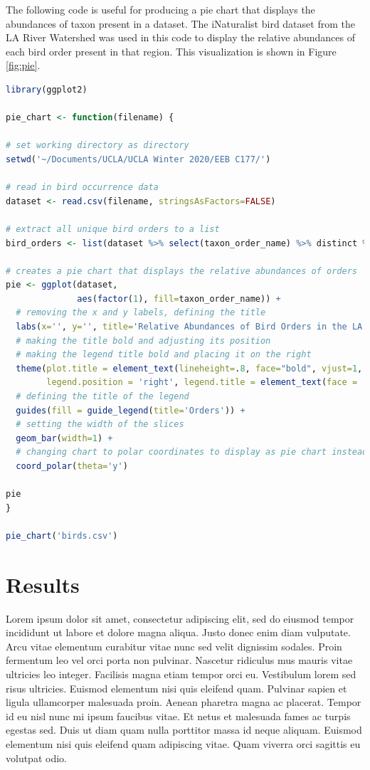 \documentclass[letterpaper]{article}
\begin{document}
\newpage

The following code is useful for producing a pie chart that displays the abundances of taxon present in a dataset. The iNaturalist bird dataset from the LA River Watershed was used in this code to display the relative abundances of each bird order present in that region. This visualization is shown in Figure \ref{fig:pie}.

\begin{lstlisting}[language=R]
library(ggplot2)

pie_chart <- function(filename) {

# set working directory as directory
setwd('~/Documents/UCLA/UCLA Winter 2020/EEB C177/')

# read in bird occurrence data
dataset <- read.csv(filename, stringsAsFactors=FALSE)

# extract all unique bird orders to a list
bird_orders <- list(dataset %>% select(taxon_order_name) %>% distinct %>% arrange(taxon_order_name))

# creates a pie chart that displays the relative abundances of orders
pie <- ggplot(dataset,
              aes(factor(1), fill=taxon_order_name)) +
  # removing the x and y labels, defining the title
  labs(x='', y='', title='Relative Abundances of Bird Orders in the LA River Watershed') +
  # making the title bold and adjusting its position
  # making the legend title bold and placing it on the right
  theme(plot.title = element_text(lineheight=.8, face="bold", vjust=1, hjust = .5),
        legend.position = 'right', legend.title = element_text(face = 'bold')) +
  # defining the title of the legend
  guides(fill = guide_legend(title='Orders')) +
  # setting the width of the slices
  geom_bar(width=1) +
  # changing chart to polar coordinates to display as pie chart instead of bars
  coord_polar(theta='y')

pie
}

pie_chart('birds.csv')
\end{lstlisting}

\section{Results}

Lorem ipsum dolor sit amet, consectetur adipiscing elit, sed do eiusmod tempor incididunt ut labore et dolore magna aliqua. Justo donec enim diam vulputate. Arcu vitae elementum curabitur vitae nunc sed velit dignissim sodales. Proin fermentum leo vel orci porta non pulvinar. Nascetur ridiculus mus mauris vitae ultricies leo integer. Facilisis magna etiam tempor orci eu. Vestibulum lorem sed risus ultricies. Euismod elementum nisi quis eleifend quam. Pulvinar sapien et ligula ullamcorper malesuada proin. Aenean pharetra magna ac placerat. Tempor id eu nisl nunc mi ipsum faucibus vitae. Et netus et malesuada fames ac turpis egestas sed. Duis ut diam quam nulla porttitor massa id neque aliquam. Euismod elementum nisi quis eleifend quam adipiscing vitae. Quam viverra orci sagittis eu volutpat odio.
\end{document}
